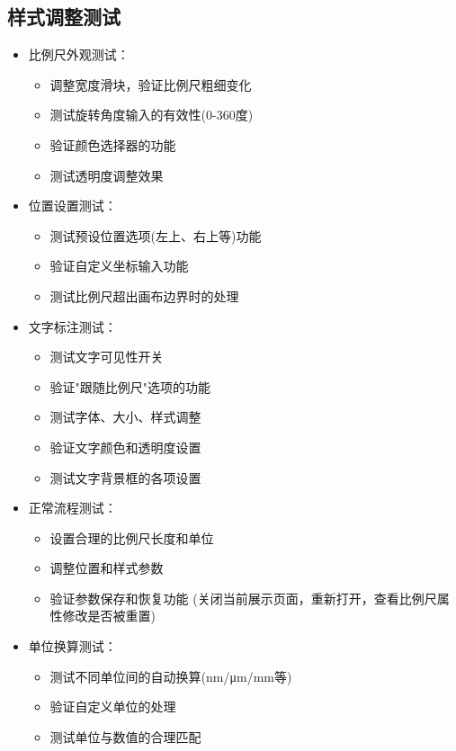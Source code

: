\documentclass[a4paper,12pt]{report}	%
\begin{document}
\subsection{样式调整测试}
\begin{itemize}
    \item 比例尺外观测试：
    \begin{itemize}
        \item 调整宽度滑块，验证比例尺粗细变化
        \item 测试旋转角度输入的有效性(0-360度)
        \item 验证颜色选择器的功能
        \item 测试透明度调整效果
    \end{itemize}
    
    \item 位置设置测试：
    \begin{itemize}
        \item 测试预设位置选项(左上、右上等)功能
        \item 验证自定义坐标输入功能
        \item 测试比例尺超出画布边界时的处理
    \end{itemize}
    
    \item 文字标注测试：
    \begin{itemize}
        \item 测试文字可见性开关
        \item 验证"跟随比例尺"选项的功能
        \item 测试字体、大小、样式调整
        \item 验证文字颜色和透明度设置
        \item 测试文字背景框的各项设置
    \end{itemize}

    \item 正常流程测试：
    \begin{itemize}
        \item 设置合理的比例尺长度和单位
        \item 调整位置和样式参数
        \item 验证参数保存和恢复功能 (关闭当前展示页面，重新打开，查看比例尺属性修改是否被重置)
    \end{itemize}
    
    \item 单位换算测试：
    \begin{itemize}
        \item 测试不同单位间的自动换算(nm/μm/mm等)
        \item 验证自定义单位的处理
        \item 测试单位与数值的合理匹配
    \end{itemize}
    
\end{itemize}
\end{document}
